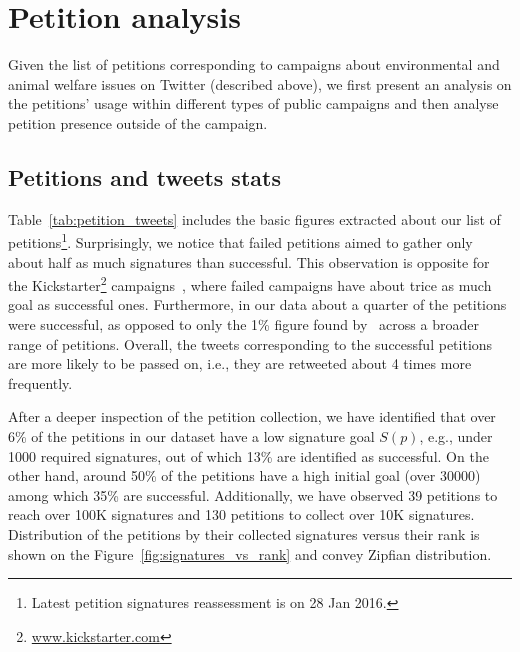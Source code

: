 \section{Petition analysis}
\label{sec:petition_analysis}

Given the list of petitions corresponding to campaigns about environmental and animal welfare issues on Twitter (described above), we first present an analysis on the petitions' usage within different types of public campaigns and then analyse petition presence outside of the campaign.

\subsection{Petitions and tweets stats}
Table~\ref{tab:petition_tweets} includes the basic figures extracted about our list of petitions\footnote{Latest petition signatures reassessment is on 28 Jan 2016.}.
Surprisingly, we notice that failed petitions aimed to gather only about half as much signatures than successful. This observation is opposite for the Kickstarter\footnote{\url{www.kickstarter.com}} campaigns~\cite{Etter2013}, where failed campaigns have about trice as much goal as successful ones.
Furthermore, in our data about a quarter of the petitions were successful, as opposed to only the 1\% figure found by~\cite{Huang2015} across a broader range of petitions.
Overall, the tweets corresponding to the successful petitions are more likely to be passed on, i.e., they are retweeted about 4 times more frequently.

After a deeper inspection of the petition collection, we have identified that over 6\% of the petitions in our dataset have a low signature goal $S(p)$, e.g., under 1000 required signatures, out of which 13\% are identified as successful.
On the other hand, around 50\% of the petitions have a high initial goal (over \num{30000}) among which 35\% are successful.
Additionally, we have observed 39 petitions to reach over 100K signatures and 130 petitions to collect over 10K signatures.
Distribution of the petitions by their collected signatures versus their rank is shown on the Figure~\ref{fig:signatures_vs_rank} and convey Zipfian distribution.

